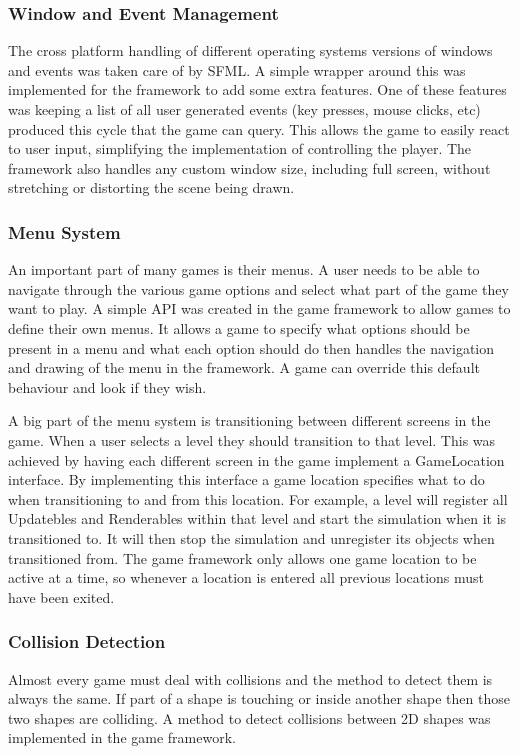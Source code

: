\documentclass[]{report}
\begin{document}
			\subsubsection{Window and Event Management}
			The cross platform handling of different operating systems versions of windows and events was taken care of by SFML. A simple wrapper around this was implemented for the framework to add some extra features. One of these features was keeping a list of all user generated events (key presses, mouse clicks, etc) produced this cycle that the game can query. This allows the game to easily react to user input, simplifying the implementation of controlling the player. The framework also handles any custom window size, including full screen, without stretching or distorting the scene being drawn.
			
			\subsubsection{Menu System}
			An important part of many games is their menus. A user needs to be able to navigate through the various game options and select what part of the game they want to play. A simple API was created in the game framework to allow games to define their own menus. It allows a game to specify what options should be present in a menu and what each option should do then handles the navigation and drawing of the menu in the framework. A game can override this default behaviour and look if they wish.
			
			A big part of the menu system is transitioning between different screens in the game. When a user selects a level they should transition to that level. This was achieved by having each different screen in the game implement a GameLocation interface. By implementing this interface a game location specifies what to do when transitioning to and from this location. For example, a level will register all Updatebles and Renderables within that level and start the simulation when it is transitioned to. It will then stop the simulation and unregister its objects when transitioned from. The game framework only allows one game location to be active at a time, so whenever a location is entered all previous locations must have been exited.
			
			\subsubsection{Collision Detection}
			Almost every game must deal with collisions and the method to detect them is always the same. If part of a shape is touching or inside another shape then those two shapes are colliding. A method to detect collisions between 2D shapes was implemented in the game framework.
			
\end{document}
